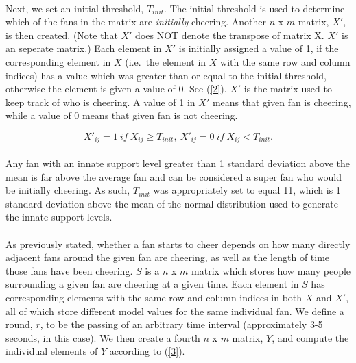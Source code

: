 \documentclass[oneside,12pt]{report}
\begin{document}
\paragraph{}
Next, we set an initial threshold, $T_{init}$. The initial threshold is used to determine which of the fans in the matrix are \textit{initially} cheering. Another $n$ x $m$ matrix, $X'$, is then created. (Note that $X'$ does NOT denote the transpose of matrix X. $X'$ is an seperate matrix.) Each element in $X'$ is initially assigned a value of 1, if the corresponding element in $X$ (i.e.~the element in $X$ with the same row and column indices) has a value which was greater than or equal to the initial threshold, otherwise the element is given a value of 0. See (\ref{2}). $X'$ is the matrix used to keep track of who is cheering. A value of 1 in $X'$ means that given fan is cheering, while a value of 0 means that given fan is not cheering. 

\begin{equation}
X'_{ij}=1~if~X_{ij}\geq T_{init},~X'_{ij}=0~if~X_{ij}<T_{init}.
\label{2}
\end{equation}

\paragraph{}
Any fan with an innate support level greater than 1 standard deviation above the mean is far above the average fan and can be considered a super fan who would be initially cheering. As such, $T_{init}$ was appropriately set to equal 11, which is 1 standard deviation above the mean of the normal distribution used to generate the innate support levels.

\paragraph{}
As previously stated, whether a fan starts to cheer depends on how many directly adjacent fans around the given fan are cheering, as well as the length of time those fans have been cheering. $S$ is a $n$ x $m$ matrix which stores how many people surrounding a given fan are cheering at a given time. Each element in $S$ has corresponding elements with the same row and column indices in both $X$ and $X'$, all of which store different model values for the same individual fan. We define a round, $r$, to be the passing of an arbitrary time interval (approximately 3-5 seconds, in this case). We then create a fourth $n$ x $m$ matrix, $Y$, and compute the individual elements of $Y$ according to (\ref{3}). 
\end{document}
